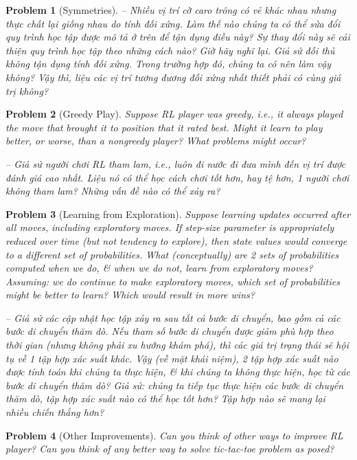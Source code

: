 \documentclass{article}
\newtheorem{problem}{Problem}
\begin{document}
\begin{itemize}
\begin{itemize}
\begin{problem}[Symmetries]
            -- Nhiều vị trí cờ caro trông có vẻ khác nhau nhưng thực chất lại giống nhau do tính đối xứng. Làm thế nào chúng ta có thể sửa đổi quy trình học tập được mô tả ở trên để tận dụng điều này? Sự thay đổi này sẽ cải thiện quy trình học tập theo những cách nào? Giờ hãy nghĩ lại. Giả sử đối thủ không tận dụng tính đối xứng. Trong trường hợp đó, chúng ta có nên làm vậy không? Vậy thì, liệu các vị trí tương đương đối xứng nhất thiết phải có cùng giá trị không?
        \end{problem}

        \begin{problem}[Greedy Play]
            Suppose RL player was greedy, i.e., it always played the move that brought it to position that it rated best. Might it learn to play better, or worse, than a nongreedy player? What problems might occur?

            -- Giả sử người chơi RL tham lam, i.e., luôn đi nước đi đưa mình đến vị trí được đánh giá cao nhất. Liệu nó có thể học cách chơi tốt hơn, hay tệ hơn, 1 người chơi không tham lam? Những vấn đề nào có thể xảy ra?
        \end{problem}

        \begin{problem}[Learning from Exploration]
            Suppose learning updates occurred after {\rm all} moves, including exploratory moves. If step-size parameter is appropriately reduced over time (but not tendency to explore), then state values would converge to a different set of probabilities. What  (conceptually) are 2 sets of probabilities computed when we do, \& when we do not, learn from exploratory moves? Assuming: we do continue to make exploratory moves, which set of probabilities might be better to learn? Which would result in more wins?

            -- Giả sử các cập nhật học tập xảy ra sau {\rm tất cả} bước di chuyển, bao gồm cả các bước di chuyển thăm dò. Nếu tham số bước di chuyển được giảm phù hợp theo thời gian (nhưng không phải xu hướng khám phá), thì các giá trị trạng thái sẽ hội tụ về 1 tập hợp xác suất khác. Vậy (về mặt khái niệm), 2 tập hợp xác suất nào được tính toán khi chúng ta thực hiện, \& khi chúng ta không thực hiện, học từ các bước di chuyển thăm dò? Giả sử: chúng ta tiếp tục thực hiện các bước di chuyển thăm dò, tập hợp xác suất nào có thể học tốt hơn? Tập hợp nào sẽ mang lại nhiều chiến thắng hơn?
        \end{problem}

        \begin{problem}[Other Improvements]
            Can you think of other ways to improve RL player? Can you think of any better way to solve tic-tac-toe problem as posed?


\end{problem}
\end{itemize}
\end{itemize}
\end{document}
